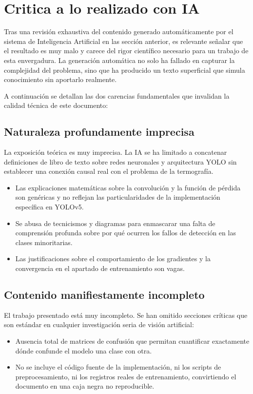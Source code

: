 \documentclass{article}
\begin{document}
\newpage
\section{Critica a lo realizado con IA}
Tras una revisión exhaustiva del contenido generado automáticamente por el sistema de Inteligencia Artificial en las sección anterior, es relevante señalar que el resultado es muy malo y carece del rigor científico necesario para un trabajo de esta envergadura. La generación automática no solo ha fallado en capturar la complejidad del problema, sino que ha producido un texto superficial que simula conocimiento sin aportarlo realmente.

A continuación se detallan las dos carencias fundamentales que invalidan la calidad técnica de este documento:

\subsection{Naturaleza profundamente imprecisa}
La exposición teórica es muy imprecisa. La IA se ha limitado a concatenar definiciones de libro de texto sobre redes neuronales y arquitectura YOLO sin establecer una conexión causal real con el problema de la termografía.
\begin{itemize}
	\item Las explicaciones matemáticas sobre la convolución y la función de pérdida son genéricas y no reflejan las particularidades de la implementación específica en YOLOv5.
	\item Se abusa de tecnicismos y diagramas para enmascarar una falta de comprensión profunda sobre por qué ocurren los fallos de detección en las clases minoritarias.
	\item Las justificaciones sobre el comportamiento de los gradientes y la convergencia en el apartado de entrenamiento son vagas.
\end{itemize}

\subsection{Contenido manifiestamente incompleto}
El trabajo presentado está muy incompleto. Se han omitido secciones críticas que son estándar en cualquier investigación seria de visión artificial:
\begin{itemize}
	\item Ausencia total de matrices de confusión que permitan cuantificar exactamente dónde confunde el modelo una clase con otra.
	\item No se incluye el código fuente de la implementación, ni los scripts de preprocesamiento, ni los registros reales de entrenamiento, convirtiendo el documento en una caja negra no reproducible.
\end{itemize}
\end{document}
